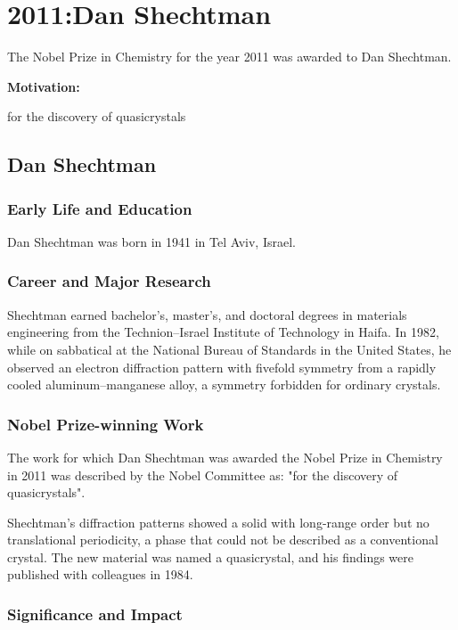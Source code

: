 \chapter{2011:Dan Shechtman}

\label{chap:chemistry2011}

The Nobel Prize in Chemistry for the year 2011 was awarded to Dan Shechtman.

\textbf{Motivation:}

for the discovery of quasicrystals

\section{Dan Shechtman}

\subsection*{Early Life and Education}

Dan Shechtman was born in 1941 in Tel Aviv, Israel.

\subsection*{Career and Major Research}

Shechtman earned bachelor's, master's, and doctoral degrees in materials engineering from the Technion--Israel Institute of Technology in Haifa. In 1982, while on sabbatical at the National Bureau of Standards in the United States, he observed an electron diffraction pattern with fivefold symmetry from a rapidly cooled aluminum--manganese alloy, a symmetry forbidden for ordinary crystals.

\subsection*{Nobel Prize-winning Work}

The work for which Dan Shechtman was awarded the Nobel Prize in Chemistry in 2011 was described by the Nobel Committee as: "for the discovery of quasicrystals".

Shechtman's diffraction patterns showed a solid with long-range order but no translational periodicity, a phase that could not be described as a conventional crystal. The new material was named a quasicrystal, and his findings were published with colleagues in 1984.

\subsection*{Significance and Impact}

